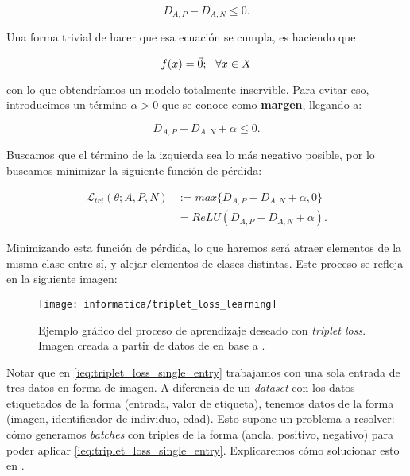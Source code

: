 \begin{equation}
	D_{A, P} - D_{A, N} \leq 0.
\end{equation}

Una forma trivial de hacer que esa ecuación se cumpla, es haciendo que

\begin{equation}
	f(x) = \vec{0}; \ \  \forall x \in X
\end{equation}

con lo que obtendríamos un modelo totalmente inservible. Para evitar eso, introducimos un término $\alpha > 0$ que se conoce como \textbf{margen}, llegando a:

\begin{equation}
	D_{A, P} - D_{A, N} + \alpha \leq 0.
\end{equation}

Buscamos que el término de la izquierda sea lo más negativo posible, por lo buscamos minimizar la siguiente función de pérdida:

\begin{equation} \label{ieq:triplet_loss_single_entry}
	\begin{split}
		\mathcal{L}_{tri}(\theta; A, P, N) & := max \{D_{A, P} - D_{A, N} + \alpha, 0 \} \\
		&= ReLU(D_{A, P} - D_{A, N} + \alpha).
	\end{split}
\end{equation}

Minimizando esta función de pérdida, lo que haremos será atraer elementos de la misma clase entre sí, y alejar elementos de clases distintas. Este proceso se refleja en la siguiente imagen:

\begin{figure}[H]
	\centering
	\texttt{[image: informatica/triplet\_loss\_learning]}
	\caption{Ejemplo gráfico del proceso de aprendizaje deseado con \textit{triplet loss}. Imagen creada a partir de datos de \cite{informatica:cacd_dataset} en base a \cite{informatica:facenet}.}
\end{figure}

Notar que en \eqref{ieq:triplet_loss_single_entry} trabajamos con una sola entrada de tres datos en forma de imagen. A diferencia de un \textit{dataset} con los datos etiquetados de la forma (entrada, valor de etiqueta), tenemos datos de la forma (imagen, identificador de individuo, edad). Esto supone un problema a resolver: cómo generamos \textit{batches} con triples de la forma (ancla, positivo, negativo) para poder aplicar \eqref{ieq:triplet_loss_single_entry}. Explicaremos cómo solucionar esto en .

